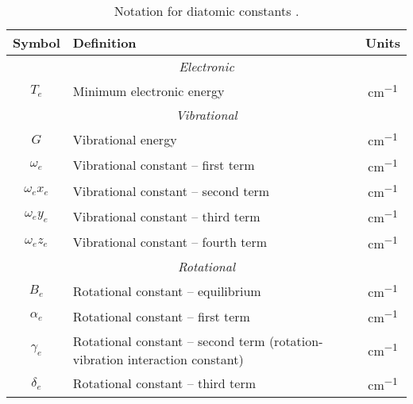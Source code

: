 \documentclass[11pt, twoside, fleqn]{report}
\begin{document}
\begin{table}[H]
    \centering
    \caption{Notation for diatomic constants \cite{herzberg:diatomic,nist:sigma1,nist:sigma3}.}
    \label{t:notation}
    \begin{tabular}{clc}
        \toprule
        Symbol            & Definition                                                                   & Units            \\
        \midrule
        \multicolumn{3}{c}{\textit{Electronic}}                                                                             \\
        \cmidrule(lr){1-3}
        $T_{e}$           & Minimum electronic energy                                                    & \unit{cm^{-1}}   \\
        \multicolumn{3}{c}{\textit{Vibrational}}                                                                            \\
        \cmidrule(lr){1-3}
        $G$               & Vibrational energy                                                           & \unit{cm^{-1}}   \\
        $\omega_{e}$      & Vibrational constant -- first term                                           & \unit{cm^{-1}}   \\
        $\omega_{e}x_{e}$ & Vibrational constant -- second term                                          & \unit{cm^{-1}}   \\
        $\omega_{e}y_{e}$ & Vibrational constant -- third term                                           & \unit{cm^{-1}}   \\
        $\omega_{e}z_{e}$ & Vibrational constant -- fourth term                                          & \unit{cm^{-1}}   \\
        \multicolumn{3}{c}{\textit{Rotational}}                                                                             \\
        \cmidrule(lr){1-3}
        $B_{e}$           & Rotational constant -- equilibrium                                           & \unit{cm^{-1}}   \\
        $\alpha_{e}$      & Rotational constant -- first term                                            & \unit{cm^{-1}}   \\
        $\gamma_{e}$      & Rotational constant -- second term (rotation-vibration interaction constant) & \unit{cm^{-1}}   \\
        $\delta_{e}$      & Rotational constant -- third term                                            & \unit{cm^{-1}}   \\

\end{tabular}
\end{table}
\end{document}
